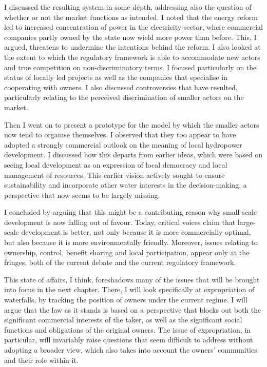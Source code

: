 I discussed the resulting system in some depth, addressing also the question of whether or not the market functions as intended. I noted that the energy reform led to increased concentration of power in the electricity sector, where commercial companies partly owned by the state now wield more power than before. This, I argued, threatens to undermine the intentions behind the reform. I also looked at the extent to which the regulatory framework is able to accommodate new actors and true competition on non-discriminatory terms. I focused particularly on the status of locally led projects as well as the companies that specialise in cooperating with owners. I also discussed controversies that have resulted, particularly relating to the perceived discrimination of smaller actors on the market.

Then I went on to present a prototype for the model by which the smaller actors now tend to organise themselves. I observed that they too appear to have adopted a strongly commercial outlook on the meaning of local hydropower development. I discussed how this departs from earlier ideas, which were based on seeing local development as an expression of local democracy and local management of resources. This earlier vision actively sought to ensure sustainability and incorporate other water interests in the decision-making, a perspective that now seems to be largely missing.

I concluded by arguing that this might be a contributing reason why small-scale development is now falling out of favour. Today, critical voices claim that large-scale development is better, not only because it is more commercially optimal, but also because it is more environmentally friendly. Moreover, issues relating to ownership, control, benefit sharing and local participation, appear only at the fringes, both of the current debate and the current regulatory framework.

This state of affairs, I think, foreshadows many of the issues that will be brought into focus in the next chapter. There, I will look specifically at expropriation of waterfalls, by tracking the position of owners under the current regime. I will argue that the law as it stands is based on a perspective that blocks out both the significant commercial interests of the taker, as well as the significant social functions and obligations of the original owners. The issue of expropriation, in particular, will invariably raise questions that seem difficult to address without adopting a broader view, which also takes into account the owners' communities and their role within it.